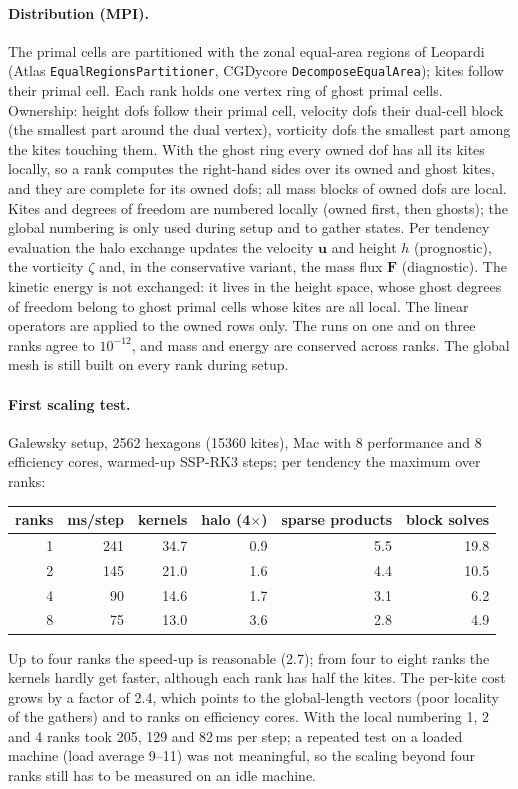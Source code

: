 \documentclass[11pt,a4paper]{article}
\newcommand{\bu}{\mathbf{u}}
\newcommand{\bF}{\mathbf{F}}
\newcommand{\code}[1]{\texttt{#1}}
\begin{document}
\paragraph{Distribution (MPI).} The primal cells are partitioned with the zonal
equal-area regions of Leopardi (Atlas \code{EqualRegionsPartitioner}, CGDycore
\code{DecomposeEqualArea}); kites follow their primal cell. Each rank holds one
vertex ring of ghost primal cells. Ownership: height dofs follow their primal
cell, velocity dofs their dual-cell block (the smallest part around the dual
vertex), vorticity dofs the smallest part among the kites touching them. With
the ghost ring every owned dof has all its kites locally, so a rank computes
the right-hand sides over its owned and ghost kites, and they are complete for
its owned dofs; all mass blocks of owned dofs are local. Kites and degrees of freedom
are numbered locally (owned first, then ghosts); the global numbering is only used
during setup and to gather states. Per tendency evaluation the halo exchange
updates the velocity $\bu$ and height $h$ (prognostic), the vorticity $\zeta$ and,
in the conservative variant, the mass flux $\bF$ (diagnostic). The kinetic energy
is not exchanged: it lives in the height space, whose ghost degrees of freedom
belong to ghost primal cells whose kites are all local. The linear operators are
applied to the owned rows only. The runs on one and on three ranks agree to
$10^{-12}$, and mass and energy are conserved across ranks. The global mesh is
still built on every rank during setup.

\paragraph{First scaling test.} Galewsky setup, 2562 hexagons (15360 kites),
Mac with 8 performance and 8 efficiency cores, warmed-up SSP-RK3 steps; per
tendency the maximum over ranks:
\begin{center}
\begin{tabular}{rrrrrr}
\toprule
ranks & ms/step & kernels & halo (4$\times$) & sparse products & block solves \\
\midrule
1 & 241 & 34.7 & 0.9 & 5.5 & 19.8 \\
2 & 145 & 21.0 & 1.6 & 4.4 & 10.5 \\
4 &  90 & 14.6 & 1.7 & 3.1 &  6.2 \\
8 &  75 & 13.0 & 3.6 & 2.8 &  4.9 \\
\bottomrule
\end{tabular}
\end{center}
Up to four ranks the speed-up is reasonable (2.7); from four to eight ranks the
kernels hardly get faster, although each rank has half the kites. The
per-kite cost grows by a factor of 2.4, which points to the global-length
vectors (poor locality of the gathers) and to ranks on efficiency cores. With
the local numbering 1, 2 and 4 ranks took 205, 129 and 82\,ms per step; a repeated
test on a loaded machine (load average 9--11) was not meaningful, so the
scaling beyond four ranks still has to be measured on an idle machine.
\end{document}
